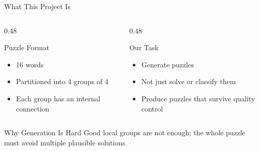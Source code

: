 \documentclass[11pt,aspectratio=169]{beamer}
\begin{document}
\begin{frame}{What This Project Is}
  \begin{columns}[T,onlytextwidth]
    \begin{column}{0.48\textwidth}
      \begin{block}{Puzzle Format}
        \begin{itemize}
          \item 16 words
          \item Partitioned into 4 groups of 4
          \item Each group has an internal connection
        \end{itemize}
      \end{block}
    \end{column}
    \begin{column}{0.48\textwidth}
      \begin{block}{Our Task}
        \begin{itemize}
          \item Generate puzzles
          \item Not just solve or classify them
          \item Produce puzzles that survive quality control
        \end{itemize}
      \end{block}
    \end{column}
  \end{columns}

  \vspace{0.25cm}
  \begin{alertblock}{Why Generation Is Hard}
    Good local groups are not enough; the whole puzzle must avoid multiple plausible solutions.
  \end{alertblock}
\end{frame}
\end{document}
